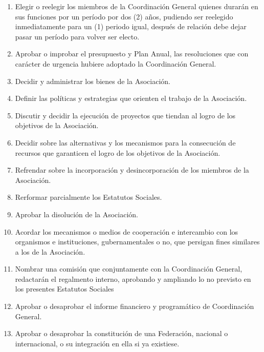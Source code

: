       \begin{enumerate}
        \item 
          Elegir o reelegir los miembros de la Coordinaci\'on General quienes
          durar\'an en sus funciones por un per\'i{}odo por dos (2) a\~nos,
          pudiendo ser reelegido inmediatamente para un (1) periodo igual,
          despu\'es de relaci\'on debe dejar pasar un per\'i{}odo para volver
          ser electo.

        \item
          Aprobar o improbar el presupuesto y Plan Anual, las resoluciones que
          con car\'acter de urgencia hubiere adoptado la Coordinaci\'on General.

        \item 
          Decidir y administrar los bienes de la Asociaci\'on.

        \item 
          Definir las pol\'i{}ticas y estrategias que orienten el trabajo de la
          Asociaci\'on.

        \item 
          Discutir y decidir la ejecuci\'on de proyectos que tiendan al logro de
          los objetivos de la Asociaci\'on.

        \item 
          Decidir sobre las alternativas y los mecanismos para la consecuci\'on
          de recursos que garanticen el logro de los objetivos de la
          Asociaci\'on.

        \item 
          Refrendar sobre la incorporaci\'on y desincorporaci\'on de los
          miembros de la Asociaci\'on. 

        \item 
          Rerformar parcialmente los Estatutos Sociales.

        \item 
          Aprobar la disoluci\'on de la Asociaci\'on.

        \item 
          Acordar los mecanismos o medios de cooperaci\'on e intercambio con los
          organismos e instituciones, gubernamentales o no, que persigan fines
          similares a los de la Asociaci\'on.

        \item 
          Nombrar una comisi\'on que conjuntamente con la Coordinaci\'on
          General, redactar\'an el regalmento interno, aprobando y ampliando lo
          no previsto en los presentes Estatutos Sociales

        \item 
          Aprobar o desaprobar el informe financiero y program\'atico de
          Coordinaci\'on General.

        \item
          Aprobar o desaprobar la constituci\'on de una Federaci\'on, nacional o
          internacional, o su integraci\'on en ella si ya existiese.

      \end{enumerate}
